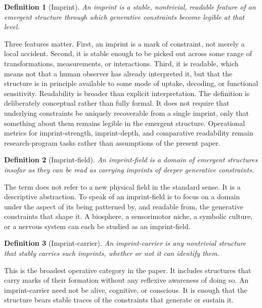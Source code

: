 \documentclass[12pt]{article}
\newtheorem{definition}{Definition}[section]
\begin{document}
\begin{definition}[Imprint]
An \emph{imprint} is a stable, nontrivial, readable feature of an emergent structure through which generative constraints become legible at that level.
\end{definition}

Three features matter. First, an imprint is a mark of constraint, not merely a local accident. Second, it is stable enough to be picked out across some range of transformations, measurements, or interactions. Third, it is readable, which means not that a human observer has already interpreted it, but that the structure is in principle available to some mode of uptake, decoding, or functional sensitivity. Readability is broader than explicit interpretation. The definition is deliberately conceptual rather than fully formal. It does not require that underlying constraints be uniquely recoverable from a single imprint, only that something about them remains legible in the emergent structure. Operational metrics for imprint-strength, imprint-depth, and comparative readability remain research-program tasks rather than assumptions of the present paper.

\begin{definition}[Imprint-field]
An \emph{imprint-field} is a domain of emergent structures insofar as they can be read as carrying imprints of deeper generative constraints.
\end{definition}

The term does not refer to a new physical field in the standard sense. It is a descriptive abstraction. To speak of an imprint-field is to focus on a domain under the aspect of its being patterned by, and readable from, the generative constraints that shape it. A biosphere, a sensorimotor niche, a symbolic culture, or a nervous system can each be studied as an imprint-field.

\begin{definition}[Imprint-carrier]
An \emph{imprint-carrier} is any nontrivial structure that stably carries such imprints, whether or not it can identify them.
\end{definition}

This is the broadest operative category in the paper. It includes structures that carry marks of their formation without any reflexive awareness of doing so. An imprint-carrier need not be alive, cognitive, or conscious. It is enough that the structure bears stable traces of the constraints that generate or sustain it.
\end{document}
